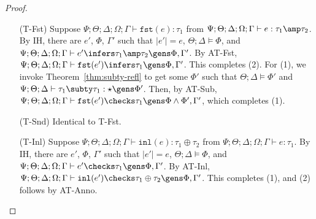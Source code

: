 \begin{proof}
\begin{itemize}
  \item[(T-Fst)] Suppose
  $\Psi ; \Theta ; \Delta ; \Omega ; \Gamma \vdash \texttt{fst}(e) : \tau_1$ from
  $\Psi ; \Theta ; \Delta ; \Omega ; \Gamma \vdash e : \tau_1 \amp \tau_2$.
  By IH, there are $e'$, $\Phi$, $\Gamma'$ such that
  $|e'| = e$,
  $\Theta ; \Delta \vDash \Phi$, and
  $\Psi ; \Theta ; \Delta ; \Omega ; \Gamma \vdash e' \infers \tau_1 \amp \tau_2 \gens \Phi,\Gamma'$.
  By AT-Fst,
  $\Psi ; \Theta ; \Delta ; \Omega ; \Gamma \vdash \texttt{fst}(e') \infers \tau_1 \gens \Phi,\Gamma'$.
  This completes (2). For (1), we invoke Theorem~\ref{thm:subty-refl} to get some $\Phi'$ such that
  $\Theta ; \Delta \vDash \Phi'$ and $\Psi ; \Theta ; \Delta \vdash \tau_1 \subty \tau_1 : \star \gens \Phi'$.
  Then, by AT-Sub,
  $\Psi ; \Theta ; \Delta ; \Omega ; \Gamma \vdash \texttt{fst}(e') \checks \tau_1 \gens \Phi \wedge \Phi',\Gamma'$,
  which completes (1).
  
  
  \item[(T-Snd)] Identical to T-Fst.
  \item[(T-Inl)] Suppose $\Psi ; \Theta ; \Delta ; \Omega ; \Gamma \vdash \texttt{inl}(e) : \tau_1 \oplus \tau_2$ from
  $\Psi ; \Theta ; \Delta ; \Omega ; \Gamma \vdash e : \tau_1$.
  By IH, there are $e'$, $\Phi$, $\Gamma'$ such that
  $|e'| = e$,
  $\Theta ; \Delta \vDash \Phi$, and
  $\Psi ; \Theta ; \Delta ; \Omega ; \Gamma \vdash e' \checks \tau_1 \gens \Phi,\Gamma'$.
  By AT-Inl,
  $\Psi ; \Theta ; \Delta ; \Omega ; \Gamma \vdash \texttt{inl}(e') \checks \tau_1 \oplus \tau_2 \gens \Phi,\Gamma'$.
  This completes (1), and (2) follows by AT-Anno.
  

\end{itemize}
\end{proof}
